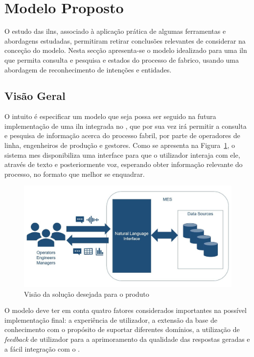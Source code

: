 \section{Modelo Proposto}
\label{sec:chap04_proposal}
O estudo das \glspl{iln}, associado à aplicação prática de algumas ferramentas e abordagens estudadas, permitiram retirar conclusões relevantes de considerar na conceção do modelo. Nesta secção apresenta-se o modelo idealizado para uma \gls{iln} que permita consulta e pesquisa e estados do processo de fabrico, usando uma abordagem de reconhecimento de intenções e entidades.

\subsection{Visão Geral}
O intuito é especificar um modelo que seja possa ser seguido na futura implementação de uma \gls{iln} integrada no {\productname}, que por sua vez irá permitir a consulta e pesquisa de informação acerca do processo fabril, por parte de operadores de linha, engenheiros de produção e gestores. Como se apresenta na Figura~\ref{fig:generic-vision}, o sistema \gls{mes} disponibiliza uma interface para que o utilizador interaja com ele, através de texto e posteriormente voz, esperando obter informação relevante do processo, no formato que melhor se enquadrar.
%
\begin{figure}[!h]
    \centering
    \includegraphics[width=.9\textwidth]{ch04/assets/generic-vision.jpg}
    \caption{Visão da solução desejada para o produto}
    \label{fig:generic-vision}
\end{figure}

O modelo deve ter em conta quatro fatores considerados importantes na possível implementação final: a experiência de utilizador, a extensão da base de conhecimento com o propósito de suportar diferentes domínios, a utilização de \textit{feedback} de utilizador para a aprimoramento da qualidade das respostas geradas e a fácil integração com o {\productname}.

